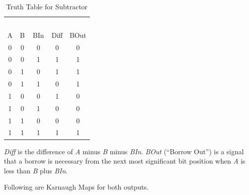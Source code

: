 \begin{table}[H]
	\sffamily
	\newcommand{\head}[1]{\textcolor{white}{\textbf{#1}}}    
	\begin{center}
		\begin{tabular}{ccc|cc} 
			\rowcolor{black!75}
			\multicolumn{3}{c}{\head{Inputs}} & \multicolumn{2}{c}{\head{Output}} \\
			A & B & BIn & Diff & BOut \\
			\hline
			0 & 0 & 0 & 0 & 0 \\
			0 & 0 & 1 & 1 & 1 \\
			0 & 1 & 0 & 1 & 1 \\
			0 & 1 & 1 & 0 & 1 \\
			1 & 0 & 0 & 1 & 0 \\
			1 & 0 & 1 & 0 & 0 \\
			1 & 1 & 0 & 0 & 0 \\
			1 & 1 & 1 & 1 & 1
		\end{tabular}
	\end{center}
	\caption{Truth Table for Subtractor}
	\label{CL:tab:truth_table_for_subtractor}
\end{table}

\emph{Diff} is the difference of \emph{A} minus \emph{B} minus \emph{BIn}. \emph{BOut} (``Borrow Out'') is a signal that a borrow is necessary from the next most significant bit position when \emph{A} is less than \emph{B} plus \emph{BIn}. 

Following are Karnaugh Maps for both outputs.

